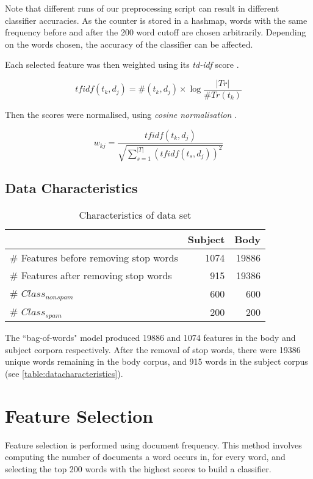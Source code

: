 \documentclass[10pt, a4paper]{article}
\begin{document}
Note that different runs of our preprocessing script can result in different classifier accuracies. As the counter is stored in a hashmap, words with the same frequency before and after the 200 word cutoff are chosen arbitrarily. Depending on the words chosen, the accuracy of the classifier can be affected.

Each selected feature was then weighted using its \emph{td-idf} score \cite{sebastiani}.

$$ tfidf(t_k, d_j) = \#(t_k, d_j) \times \log \frac{|Tr|}{\#Tr(t_k)} $$

Then the scores were normalised, using \emph{cosine normalisation} \cite{sebastiani}.

$$ w_{kj} = \frac{tfidf(t_k, d_j)}{\sqrt{\sum_{s=1}^{|T|} (tfidf(t_s, d_j))^2 }} $$

\subsection{Data Characteristics}

\setlength\extrarowheight{3pt}

\begin{table}[H]
\centering
\caption{Characteristics of data set}
\begin{tabular}{@{}lrr@{}}
\toprule
& \textbf{Subject} & \textbf{Body} \\
\midrule
\# Features before removing stop words & 1074 & 19886 \\
\# Features after removing stop words & 915 & 19386 \\
\# $Class_{nonspam}$ & 600 & 600 \\
\# $Class_{spam}$ & 200 & 200 \\
\bottomrule
\end{tabular}
\label{table:datacharacteristics}
\end{table}

The ``bag-of-words" model produced 19886 and 1074 features in the body and subject corpora respectively. After the removal of stop words, there were 19386 unique words remaining in the body corpus, and 915 words in the subject corpus (see \autoref{table:datacharacteristics}).

\section{Feature Selection}

Feature selection is performed using document frequency. This method involves computing the number of documents a word occurs in, for every word, and selecting the top 200 words with the highest scores to build a classifier.
\end{document}
